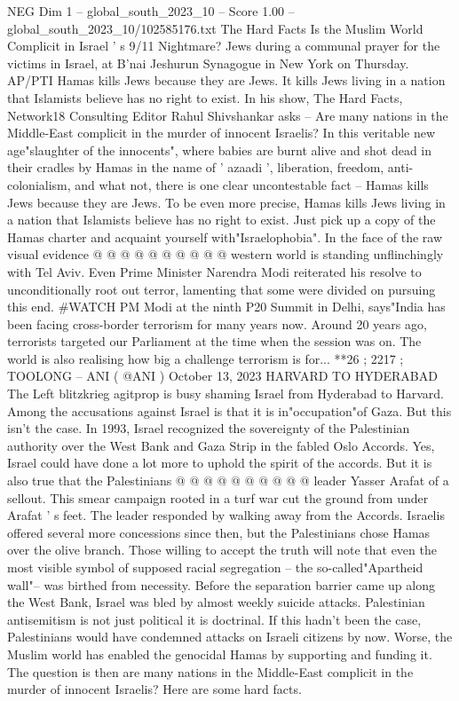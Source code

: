 \begin{textsample}{NEG Dim 1 – global\_south\_2023\_10 – Score 1.00 – global\_south\_2023\_10/102585176.txt}  \label{ex:f1_neg_265}
The Hard Facts Is the Muslim World Complicit in Israel ' s 9/11 Nightmare?
Jews during a communal prayer for the victims in Israel, at B'nai Jeshurun Synagogue in New York on Thursday.
AP/PTI Hamas kills Jews because they are Jews.
It kills Jews living in a nation that Islamists believe has no right to exist.
In his show, The Hard Facts, Network18 Consulting Editor Rahul Shivshankar asks -- Are many nations in the Middle-East complicit in the murder of innocent Israelis?
In this veritable new age"slaughter of the innocents", where babies are burnt alive and shot dead in their cradles by Hamas in the name of ' azaadi ', liberation, freedom, anti-colonialism, and what not, there is one clear uncontestable fact -- Hamas kills Jews because they are Jews.
To be even more precise, Hamas kills Jews living in a nation that Islamists believe has no right to exist.
Just pick up a copy of the Hamas charter and acquaint yourself with"Israelophobia".
In the face of the raw visual evidence @ @ @ @ @ @ @ @ @ @ western world is standing unflinchingly with Tel Aviv.
Even Prime Minister Narendra Modi reiterated his resolve to unconditionally root out terror, lamenting that some were divided on pursuing this end. \#WATCH PM Modi at the ninth P20 Summit in Delhi, says"India has been facing cross-border terrorism for many years now.
Around 20 years ago, terrorists targeted our Parliament at the time when the session was on.
The world is also realising how big a challenge terrorism is for... **26 ; 2217 ; TOOLONG -- ANI ( @ANI ) October 13, 2023 HARVARD TO HYDERABAD The Left blitzkrieg agitprop is busy shaming Israel from Hyderabad to Harvard.
Among the accusations against Israel is that it is in"occupation"of Gaza.
But this isn't the case.
In 1993, Israel recognized the sovereignty of the Palestinian authority over the West Bank and Gaza Strip in the fabled Oslo Accords.
Yes, Israel could have done a lot more to uphold the spirit of the accords.
But it is also true that the Palestinians @ @ @ @ @ @ @ @ @ @ leader Yasser Arafat of a sellout.
This smear campaign rooted in a turf war cut the ground from under Arafat ' s feet.
The leader responded by walking away from the Accords.
Israelis offered several more concessions since then, but the Palestinians chose Hamas over the olive branch.
Those willing to accept the truth will note that even the most visible symbol of supposed racial segregation -- the so-called"Apartheid wall"-- was birthed from necessity.
Before the separation barrier came up along the West Bank, Israel was bled by almost weekly suicide attacks.
Palestinian antisemitism is not just political it is doctrinal.
If this hadn't been the case, Palestinians would have condemned attacks on Israeli citizens by now.
Worse, the Muslim world has enabled the genocidal Hamas by supporting and funding it.
The question is then are many nations in the Middle-East complicit in the murder of innocent Israelis?
Here are some hard facts.

\end{textsample}
